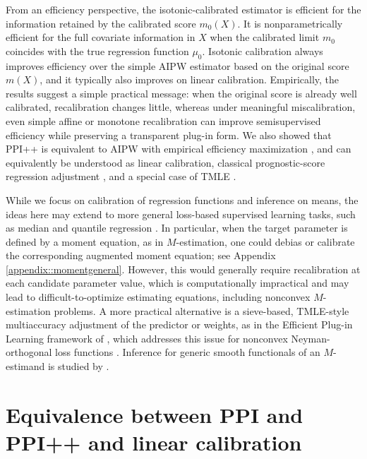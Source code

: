 \documentclass{article}
\theoremstyle{plain}
\theoremstyle{definition}
\newcommand{\1}{\mathbbm{1}}
\begin{document}
From an efficiency perspective, the isotonic-calibrated estimator is efficient for the information retained by the calibrated score \(m_0(X)\). It is nonparametrically efficient for the full covariate information in \(X\) when the calibrated limit \(m_0\) coincides with the true regression function \(\mu_0\). Isotonic calibration always improves efficiency over the simple AIPW estimator based on the original score \(m(X)\), and it typically also improves on linear calibration. Empirically, the results suggest a simple practical message: when the original score is already well calibrated, recalibration changes little, whereas under meaningful miscalibration, even simple affine or monotone recalibration can improve semisupervised efficiency while preserving a transparent plug-in form. We also showed that PPI++ is equivalent to AIPW with empirical efficiency maximization \citep{rubin2008empirical}, and can equivalently be understood as linear calibration, classical prognostic-score regression adjustment \citep{hansen2008prognostic,rosenblum2009using,hojbjerre2025powering}, and a special case of TMLE \citep{van2006targeted}.

While we focus on calibration of regression functions and inference on means, the ideas here may extend to more general loss-based supervised learning tasks, such as median and quantile regression \citep{noarov2023statistical,jung2021moment,roth2022uncertain,whitehouse2024orthogonal}. In particular, when the target parameter is defined by a moment equation, as in \(M\)-estimation, one could debias or calibrate the corresponding augmented moment equation; see Appendix \ref{appendix::momentgeneral}. However, this would generally require recalibration at each candidate parameter value, which is computationally impractical and may lead to difficult-to-optimize estimating equations, including nonconvex \(M\)-estimation problems. A more practical alternative is a sieve-based, TMLE-style multiaccuracy adjustment of the predictor or weights, as in the Efficient Plug-in Learning framework of \citet{van2024combining}, which addresses this issue for nonconvex Neyman-orthogonal loss functions \citep{foster2023orthogonal}. Inference for generic smooth functionals of an \(M\)-estimand is studied by \citet{van2025automatic}.




 

 


\appendix
 
\section{Equivalence between PPI and PPI++ and linear calibration}
\label{sec::ppi++}
\end{document}
